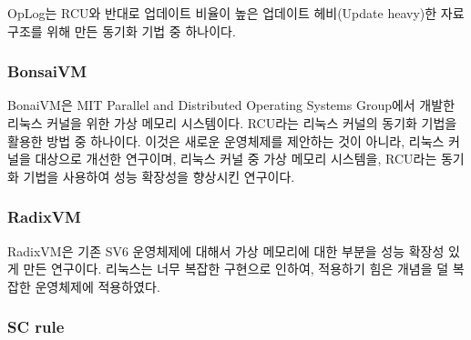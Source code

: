 OpLog는 RCU와 반대로 업데이트 비율이 높은 업데이트 헤비(Update heavy)한 자료구조를 위해 만든 
동기화 기법 중 하나이다.



\subsubsection{BonsaiVM}
BonaiVM은 MIT Parallel and Distributed Operating Systems Group에서 개발한 리눅스 커널을 위한 
가상 메모리 시스템이다. 
RCU라는 리눅스 커널의 동기화 기법을 활용한 방법 중 하나이다.
이것은 새로운 운영체제를 제안하는 것이 아니라, 리눅스 커널을 대상으로 개선한 연구이며, 
리눅스 커널 중 가상 메모리 시스템을, RCU라는 동기화 기법을 사용하여 성능 확장성을 향상시킨 연구이다.



\subsubsection{RadixVM}

RadixVM은 기존 SV6 운영체제에 대해서 가상 메모리에 대한 부분을 성능 확장성 있게 만든 연구이다.
리눅스는 너무 복잡한 구현으로 인하여, 적용하기 힘은 개념을 덜 복잡한 운영체제에 적용하였다. 




\subsubsection{SC rule}





